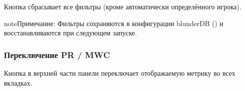 \documentclass[letterpaper,10pt,russian]{sphinxmanual}
\begin{document}
\sphinxAtStartPar
Кнопка  сбрасывает все фильтры (кроме автоматически определённого игрока).

\begin{sphinxadmonition}{note}{Примечание:}
\sphinxAtStartPar
Фильтры сохраняются в конфигурации blunderDB () и восстанавливаются при следующем запуске.
\end{sphinxadmonition}


\subsubsection{Переключение PR / MWC}
\label{\detokenize{manuel:toggle-pr-mwc}}
\sphinxAtStartPar
Кнопка  в верхней части панели переключает отображаемую метрику во всех вкладках.
\end{document}
